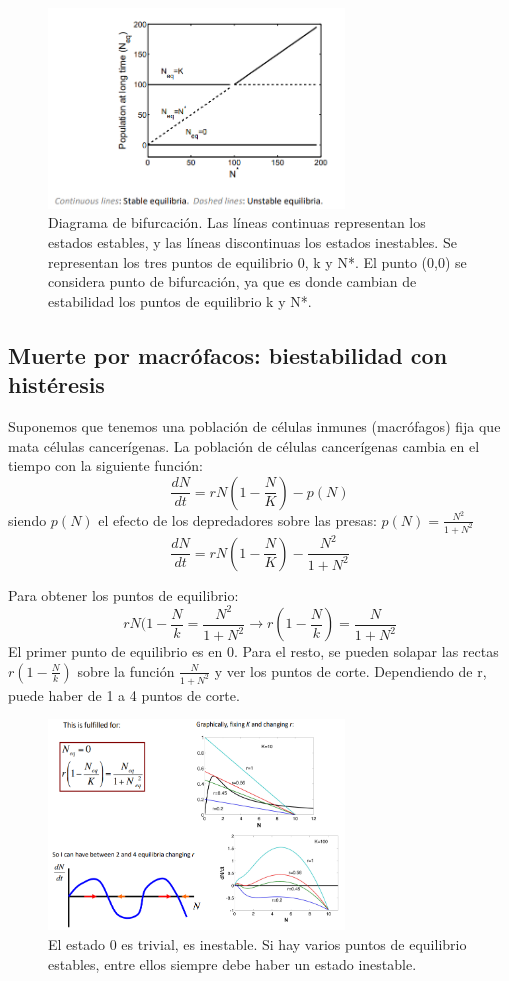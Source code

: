 \begin{figure}[h]
\centering
\includegraphics[width = 0.7\textwidth]{figs/bifurcation-diagram.png}
\caption{Diagrama de bifurcación. Las líneas continuas representan los estados estables, y las líneas discontinuas los estados inestables. Se representan los tres puntos de equilibrio 0, k y N*. El punto (0,0) se considera punto de bifurcación, ya que es donde cambian de estabilidad los puntos de equilibrio k y N*.}
\end{figure}

\subsection{Muerte por macrófacos: biestabilidad con histéresis}
Suponemos que tenemos una población de células inmunes (macrófagos) fija que mata células cancerígenas. La población de células cancerígenas cambia en el tiempo con la siguiente función:
$$\frac{dN}{dt} = rN(1 - \frac{N}{K}) - p(N)$$
siendo $p(N)$ el efecto de los depredadores sobre las presas: $p(N) = \frac{N^2}{1 + N^2}$
$$\frac{dN}{dt} = rN(1 - \frac{N}{K}) - \frac{N^2}{1 + N^2}$$

Para obtener los puntos de equilibrio:
$$rN (1 - \frac{N}{k} = \frac{N^2}{1 + N^2} \rightarrow r(1 - \frac{N}{k}) = \frac{N}{1 + N^2}$$
El primer punto de equilibrio es en 0. Para el resto, se pueden solapar las rectas $r(1 - \frac{N}{k})$ sobre la función $\frac{N}{1 + N^2}$ y ver los puntos de corte. Dependiendo de r, puede haber de 1 a 4 puntos de corte. 

\begin{figure}[h]
\centering
\includegraphics[width = 0.7\textwidth]{figs/biestabilidad-histeresis.png}
\caption{El estado 0 es trivial, es inestable. Si hay varios puntos de equilibrio estables, entre ellos siempre debe haber un estado inestable.}
\end{figure}

